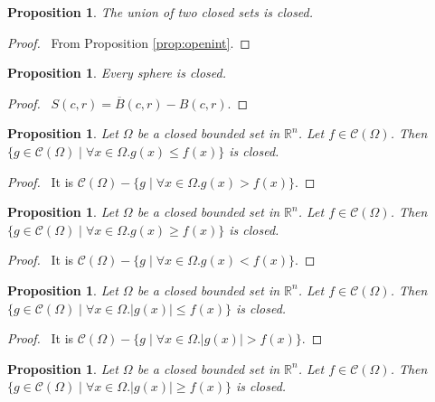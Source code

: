 \documentclass{book}
\let\qed\relax
\newtheorem{prop}[ax]{Proposition}
\theoremstyle{definition}
\begin{document}
\begin{prop}
The union of two closed sets is closed.
\end{prop}

\begin{proof}
\pf\ From Proposition \ref{prop:openint}. \qed
\end{proof}

\begin{prop}
Every sphere is closed.
\end{prop}

\begin{proof}
\pf\ $S(c,r) = \overline{B}(c,r) - B(c,r)$. \qed
\end{proof}

\begin{prop}
Let $\Omega$ be a closed bounded set in $\mathbb{R}^n$. Let $f \in \mathcal{C}(\Omega)$. Then $\{ g \in \mathcal{C}(\Omega) \mid \forall x \in \Omega. g(x) \leq f(x) \}$ is closed.
\end{prop}

\begin{proof}
\pf\ It is $\mathcal{C}(\Omega) - \{ g \mid \forall x \in \Omega. g(x) > f(x) \}$. \qed
\end{proof}

\begin{prop}
Let $\Omega$ be a closed bounded set in $\mathbb{R}^n$. Let $f \in \mathcal{C}(\Omega)$. Then $\{ g \in \mathcal{C}(\Omega) \mid \forall x \in \Omega. g(x) \geq f(x) \}$ is closed.
\end{prop}

\begin{proof}
\pf\ It is $\mathcal{C}(\Omega) - \{ g \mid \forall x \in \Omega. g(x) < f(x) \}$. \qed
\end{proof}

\begin{prop}
Let $\Omega$ be a closed bounded set in $\mathbb{R}^n$. Let $f \in \mathcal{C}(\Omega)$. Then $\{ g \in \mathcal{C}(\Omega) \mid \forall x \in \Omega. |g(x)| \leq f(x) \}$ is closed.
\end{prop}

\begin{proof}
\pf\ It is $\mathcal{C}(\Omega) - \{ g \mid \forall x \in \Omega. |g(x)| > f(x) \}$. \qed
\end{proof}

\begin{prop}
Let $\Omega$ be a closed bounded set in $\mathbb{R}^n$. Let $f \in \mathcal{C}(\Omega)$. Then $\{ g \in \mathcal{C}(\Omega) \mid \forall x \in \Omega. |g(x)| \geq f(x) \}$ is closed.
\end{prop}
\end{document}
